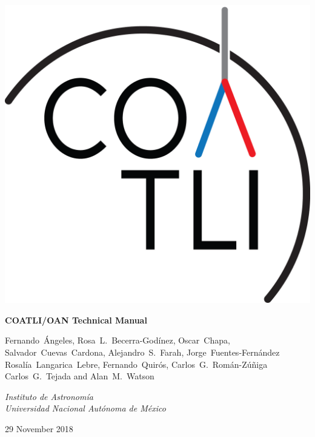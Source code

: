 
\pagestyle{empty}

\begin{centering}

\ifcoatlioan
\bigskip
\bigskip
\includegraphics[width=\linewidth]{figures/logo-gn.png}
\bigskip
\bigskip
{
 \Large
 \bfseries 
 COATLI/OAN Technical Manual
 \par
}
\bigskip
{
\baselineskip=10pt
 \large
 Fernando~Ángeles,
 Rosa~L.~Becerra-Godínez,
 Oscar~Chapa,\\
 Salvador~Cuevas~Cardona,
 Alejandro~S.~Farah,
 Jorge~Fuentes-Fernández\\
 Rosalía~Langarica~Lebre,
 Fernando~Quirós,
 Carlos~G.~Román-Zúñiga\\
 Carlos~G.~Tejada
 and
 Alan~M.~Watson
 \par
}
\bigskip
{
 \large
 \itshape 
 Instituto de Astronomía\\
 Universidad Nacional Autónoma de México
 \par
}
\bigskip
{
 \large
 29 November 2018
}
\fi

\ifddotioan
\bigskip
\bigskip


\end{centering}
